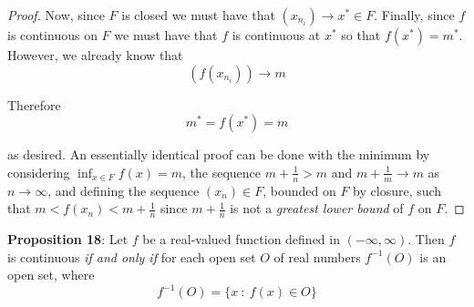 \documentclass[12pt]{article}
\newlength\tindent
\renewcommand{\indent}{\hspace*{\tindent}}
\begin{document}
\begin{proof}
\indent Now, since $F$ is closed we must have that $(x_{n_i}) \to x^* \in F$. Finally, since $f$ is continuous on $F$ we must have that $f$ is continuous at $x^*$ so that $f(x^*) = m^*$. However, we already know that
\begin{equation*}
	(f(x_{n_i})) \to m
\end{equation*}

Therefore
\begin{equation*}
	m^* = f(x^*) = m
\end{equation*}

as desired. An essentially identical proof can be done with the minimum by considering $\inf_{x\in F} f(x) = m$, the sequence $m + \frac{1}{n} > m$ and $m + \frac{1}{m} \to m$ as $n \to \infty$, and defining the sequence $(x_n) \in F$, bounded on $F$ by closure, such that $m < f(x_n) < m + \frac{1}{n}$ since $m + \frac{1}{n}$ is not a {\em greatest lower bound} of $f$ on $F$.
\end{proof}

%
%
{\bf Proposition 18}: Let $f$ be a real-valued function defined in $(-\infty, \infty)$. Then $f$ is continuous {\em if and only if} for each open set $O$ of real numbers $f^{-1}(O)$ is an open set, where
\begin{equation*}
	f^{-1}(O) = \{x ~:~ f(x) \in O\}
\end{equation*}
\end{document}
